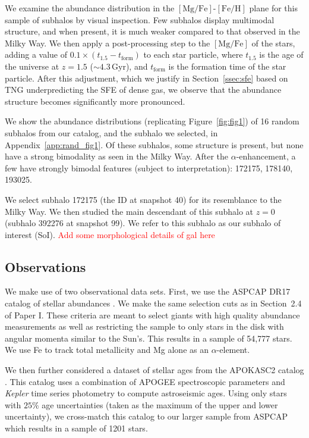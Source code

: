 \documentclass[twocolumn]{aastex631}
\newcommand{\Gyr}{\ensuremath{\textrm{Gyr}}}
\newcommand{\FeH}{\ensuremath{[\textrm{Fe}/\textrm{H}]}}
\newcommand{\MgFe}{\ensuremath{[\textrm{Mg}/\textrm{Fe}]}}
\newcommand{\red}[1]{\textcolor{red}{#1}}
\begin{document}
We examine the abundance distribution in the \MgFe{}-\FeH{} plane for this sample of subhalos by visual inspection. Few subhalos display multimodal structure, and when present, it is much weaker compared to that observed in the Milky Way. We then apply a post-processing step to the \MgFe{} of the stars, adding a value of $0.1\times\left(t_{1.5}-t_{\textrm{form}}\right)$ to each star particle, where $t_{1.5}$ is the age of the universe at $z=1.5$ ($\sim4.3\,\Gyr$), and $t_{\textrm{form}}$ is the formation time of the star particle. After this adjustment, which we justify in Section~\ref{ssec:sfe} based on TNG underpredicting the SFE of dense gas, we observe that the abundance structure becomes significantly more pronounced.

We show the abundance distributions (replicating Figure~\ref{fig:fig1}) of 16 random subhalos from our catalog, and the subhalo we selected, in Appendix~\ref{app:rand_fig1}. Of these subhalos, some structure is present, but none have a strong bimodality as seen in the Milky Way. After the $\alpha$-enhancement, a few have strongly bimodal features (subject to interpretation): 172175, 178140, 193025.

We select subhalo 172175 (the ID at snapshot 40) for its resemblance to the Milky Way. We then studied the main descendant of this subhalo at $z=0$ (subhalo 392276 at snapshot 99). We refer to this subhalo as our subhalo of interest (SoI). \red{Add some morphological details of gal here}

\subsection{Observations}\label{ssec:obs}
We make use of two observational data sets. First, we use the ASPCAP DR17 catalog of stellar abundances \citep[][J.A.~Holtzman et al., in preparation]{2016AJ....151..144G}. We make the same selection cuts as in Section~2.4 of Paper I. These criteria are meant to select giants with high quality abundance measurements as well as restricting the sample to only stars in the disk with angular momenta similar to the Sun's. This results in a sample of 54,777 stars. We use Fe to track total metallicity and Mg alone as an $\alpha$-element.

We then further considered a dataset of stellar ages from the APOKASC2 catalog \citep{2018ApJS..239...32P}. This catalog uses a combination of APOGEE spectroscopic parameters and \textit{Kepler} time series photometry to compute astroseismic ages. Using only stars with $25\%$ age uncertainties (taken as the maximum of the upper and lower uncertainty), we cross-match this catalog to our larger sample from ASPCAP which results in a sample of 1201 stars.
\end{document}
